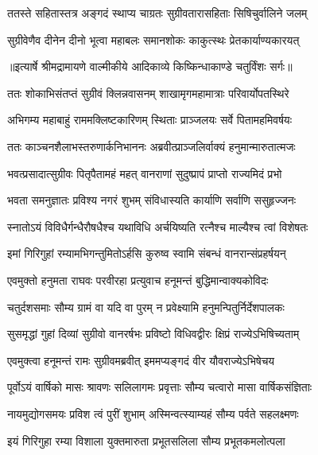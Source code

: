 \twolineshloka
{ततस्ते सहितास्तत्र अङ्गदं स्थाप्य चाग्रतः}
{सुग्रीवतारासहिताः सिषिचुर्वालिने जलम्} %

\twolineshloka
{सुग्रीवेणैव दीनेन दीनो भूत्वा महाबलः}
{समानशोकः काकुत्स्थः प्रेतकार्याण्यकारयत्} %


{॥इत्यार्षे श्रीमद्रामायणे वाल्मीकीये आदिकाव्ये किष्किन्धाकाण्डे चतुर्विंशः सर्गः॥}


\twolineshloka
{ततः शोकाभिसंतप्तं सुग्रीवं क्लिन्नवासनम्}
{शाखामृगमहामात्राः परिवार्योपतस्थिरे} %

\twolineshloka
{अभिगम्य महाबाहुं राममक्लिष्टकारिणम्}
{स्थिताः प्राञ्जलयः सर्वे पितामहमिवर्षयः} %

\twolineshloka
{ततः काञ्चनशैलाभस्तरुणार्कनिभाननः}
{अब्रवीत्प्राञ्जलिर्वाक्यं हनुमान्मारुतात्मजः} %

\twolineshloka
{भवत्प्रसादात्सुग्रीवः पितृपैतामहं महत्}
{वानराणां सुदुष्प्रापं प्राप्तो राज्यमिदं प्रभो} %

\twolineshloka
{भवता समनुज्ञातः प्रविश्य नगरं शुभम्}
{संविधास्यति कार्याणि सर्वाणि ससुहृज्जनः} %

\twolineshloka
{स्नातोऽयं विविधैर्गन्धैरौषधैश्च यथाविधि}
{अर्चयिष्यति रत्नैश्च माल्यैश्च त्वां विशेषतः} %

\twolineshloka
{इमां गिरिगुहां रम्यामभिगन्तुमितोऽर्हसि}
{कुरुष्व स्वामि संबन्धं वानरान्संप्रहर्षयन्} %

\twolineshloka
{एवमुक्तो हनुमता राघवः परवीरहा}
{प्रत्युवाच हनूमन्तं बुद्धिमान्वाक्यकोविदः} %

\twolineshloka
{चतुर्दशसमाः सौम्य ग्रामं वा यदि वा पुरम्}
{न प्रवेक्ष्यामि हनुमन्पितुर्निर्देशपालकः} %

\twolineshloka
{सुसमृद्धां गुहां दिव्यां सुग्रीवो वानरर्षभः}
{प्रविष्टो विधिवद्वीरः क्षिप्रं राज्येऽभिषिच्यताम्} %

\twolineshloka
{एवमुक्त्वा हनूमन्तं रामः सुग्रीवमब्रवीत्}
{इममप्यङ्गदं वीर यौवराज्येऽभिषेचय} %

\twolineshloka
{पूर्वोऽयं वार्षिको मासः श्रावणः सलिलागमः}
{प्रवृत्ताः सौम्य चत्वारो मासा वार्षिकसंज्ञिताः} %

\twolineshloka
{नायमुद्योगसमयः प्रविश त्वं पुरीं शुभाम्}
{अस्मिन्वत्स्याम्यहं सौम्य पर्वते सहलक्ष्मणः} %

\twolineshloka
{इयं गिरिगुहा रम्या विशाला युक्तमारुता}
{प्रभूतसलिला सौम्य प्रभूतकमलोत्पला} %

